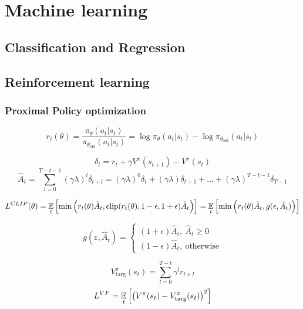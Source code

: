 \documentclass[12pt, a4paper,  nobibnotes]{article}
\begin{document}
\section{Machine learning}
\subsection{Classification and Regression}
\subsection{Reinforcement learning}
\subsubsection{Proximal Policy optimization}
\begin{equation}
r_t(\theta) = \frac{\pi_{\theta}(a_t|s_t)}{\pi_{\theta_{\textrm{old}}}(a_t|s_t)}
= \log\pi_{\theta}(a_t|s_t) - \log \pi_{\theta_{\textrm{old}}}(a_t|s_t)
\end{equation}

\begin{equation}
    \delta_t = r_t + \gamma V^{\pi}(s_{t+1}) - V^{\pi}(s_t) 
\end{equation}
\begin{equation}
    \hat A_t = \sum\limits_{l=0}^{T-t-1} (\gamma\lambda)^{l}\delta_{t+l}
    = (\gamma\lambda)^0\delta_t + (\gamma\lambda)\delta_{t+1} + ... + (\gamma\lambda)^{T-t-1}\delta_{T-1}
\end{equation}

\begin{equation}
L^{CLIP}(\theta) = \underset{t}{\LARGE{\mathbb E}}\left[\min\left(r_t(\theta)\hat A_t, \textrm{clip}(r_t(\theta),1-\epsilon,1+\epsilon)\hat A_t\right)\right]
= \underset{t}{\LARGE{\mathbb E}} \left[
    \min\left( r_t(\theta)\hat A_t, g(\epsilon,\hat A_t)
    \right)
\right]
\end{equation}

\begin{equation}
g(\varepsilon, \hat A_t) = \begin{cases}
(1+\epsilon) \hat A_t, ~\hat A_t \geq 0 \\
(1-\epsilon) \hat A_t, ~\textrm{otherwise}
\end{cases}
\end{equation}

\begin{equation}
V_{\textrm{targ}}^{\pi}(s_t) = \sum\limits_{l=0}^{T-t} \gamma^lr_{t+l}
\end{equation}
\begin{equation}
L^{VF} = \underset{t}{\LARGE{\mathbb E}} \left[\left(V^{\pi}(s_t) - V_{\textrm{targ}}^{\pi}(s_t)\right)^2\right]
\end{equation}
\end{document}
